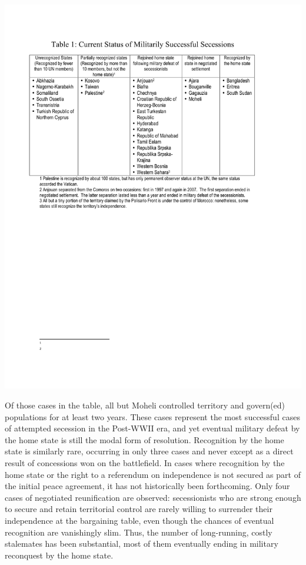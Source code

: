 \documentclass[11pt,letterpaper, notitlepage]{article}
\begin{document}
\begin{center}
\includegraphics[width=6.25in]{Table_1_082214.pdf}
\end{center}

Of those cases in the table, all but Moheli controlled territory and govern(ed) populations for at least two years. These cases represent the most successful cases of attempted secession in the Post-WWII era, and yet eventual military defeat by the home state is still the modal form of resolution. Recognition by the home state is similarly rare, occurring in only three cases and never except as a direct result of concessions won on the battlefield. In cases where recognition by the home state or the right to a referendum on independence is not secured as part of the initial peace agreement, it has not historically been forthcoming. Only four cases of negotiated reunification are observed: secessionists who are strong enough to secure and retain territorial control are rarely willing to surrender their independence at the bargaining table, even though the chances of eventual recognition are vanishingly slim. Thus, the number of long-running, costly stalemates has been substantial, most of them eventually ending in military reconquest by the home state.
\end{document}
